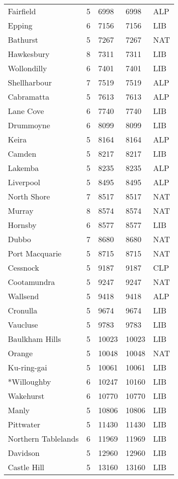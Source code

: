 \documentclass{article}
\begin{document}
\begin{center}
\begin{longtable}{lllll}
Fairfield & 5 & 6998 & 6998 & ALP \\
Epping & 6 & 7156 & 7156 & LIB \\
Bathurst & 5 & 7267 & 7267 & NAT \\
Hawkesbury & 8 & 7311 & 7311 & LIB \\
Wollondilly & 6 & 7401 & 7401 & LIB \\
Shellharbour & 7 & 7519 & 7519 & ALP \\
Cabramatta & 5 & 7613 & 7613 & ALP \\
Lane Cove & 6 & 7740 & 7740 & LIB \\
Drummoyne & 6 & 8099 & 8099 & LIB \\
Keira & 5 & 8164 & 8164 & ALP \\
Camden & 5 & 8217 & 8217 & LIB \\
Lakemba & 5 & 8235 & 8235 & ALP \\
Liverpool & 5 & 8495 & 8495 & ALP \\
North Shore & 7 & 8517 & 8517 & NAT \\
Murray & 8 & 8574 & 8574 & NAT \\
Hornsby & 6 & 8577 & 8577 & LIB \\
Dubbo & 7 & 8680 & 8680 & NAT \\
Port Macquarie & 5 & 8715 & 8715 & NAT \\
Cessnock & 5 & 9187 & 9187 & CLP \\
Cootamundra & 5 & 9247 & 9247 & NAT \\
Wallsend & 5 & 9418 & 9418 & ALP \\
Cronulla & 5 & 9674 & 9674 & LIB \\
Vaucluse & 5 & 9783 & 9783 & LIB \\
Baulkham Hills & 5 & 10023 & 10023 & LIB \\
Orange & 5 & 10048 & 10048 & NAT \\
Ku-ring-gai & 5 & 10061 & 10061 & LIB \\
*Willoughby & 6 & 10247 & 10160 & LIB \\
Wakehurst & 6 & 10770 & 10770 & LIB \\
Manly & 5 & 10806 & 10806 & LIB \\
Pittwater & 5 & 11430 & 11430 & LIB \\
Northern Tablelands & 6 & 11969 & 11969 & LIB \\
Davidson & 5 & 12960 & 12960 & LIB \\
Castle Hill & 5 & 13160 & 13160 & LIB \\
\hline
\end{longtable}
 \end{center}
 
\end{document}

